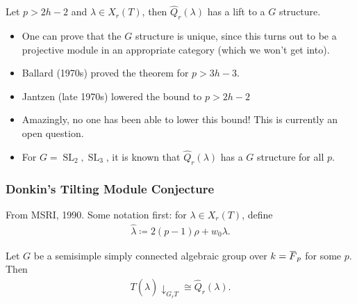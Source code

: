 \begin{theorem}[?]

Let \(p > 2h-2\) and \(\lambda \in X_r(T)\), then
\(\widehat{Q}_r(\lambda)\) has a lift to a \(G\) structure.

\end{theorem}

\begin{remark}

\envlist

\begin{itemize}
\item
  One can prove that the \(G\) structure is unique, since this turns out
  to be a projective module in an appropriate category (which we won't
  get into).
\item
  Ballard (1970s) proved the theorem for \(p>3h-3\).
\item
  Jantzen (late 1970s) lowered the bound to \(p>2h-2\)
\item
  Amazingly, no one has been able to lower this bound! This is currently
  an open question.
\item
  For \(G = {\operatorname{SL}}_2, {\operatorname{SL}}_3\), it is known
  that \(\widehat{Q}_r(\lambda)\) has a \(G\) structure for all \(p\).
\end{itemize}

\end{remark}

\hypertarget{donkins-tilting-module-conjecture}{%
\subsubsection{Donkin's Tilting Module
Conjecture}\label{donkins-tilting-module-conjecture}}

From MSRI, 1990. Some notation first: for \(\lambda \in X_r(T)\), define
\begin{align*}  
\widehat{\lambda} \coloneqq 2(p-1) \rho + w_0 \lambda
.\end{align*}

\begin{conjecture}[?]

Let \(G\) be a semisimple simply connected algebraic group over
\(k = \mkern 1.5mu\overline{\mkern-1.5muF\mkern-1.5mu}\mkern 1.5mu_p\)
for some \(p\). Then
\begin{align*}  
T(\widehat{\lambda}) \downarrow_{G_r T} \cong \widehat{Q}_r(\lambda)
.\end{align*}

\end{conjecture}

